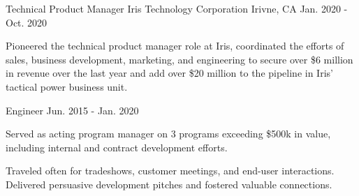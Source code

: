 \begin{cventries}
  \cventry
    {Technical Product Manager} %
    {Iris Technology Corporation} %
    {Irivne, CA} %
    {Jan. 2020 - Oct. 2020} %
    {
      \begin{cvitems} %
        \item {Pioneered the technical product manager role at Iris, coordinated the efforts of sales, business development, marketing, and engineering to secure over \$6 million in revenue over the last year and add over \$20 million to the pipeline in Iris' tactical power business unit.}
     \end{cvitems}
    }

    \cventry
    {Engineer} %
    {} %
    {}
    {Jun. 2015 - Jan. 2020} %
    {
      \begin{cvitems} %
      \item {Served as acting program manager on 3 programs exceeding \$500k in value, including internal and contract development efforts.}
        \item {Traveled often for tradeshows, customer meetings, and end-user interactions. Delivered persuasive development pitches and fostered valuable connections.}
      \end{cvitems}
    }

\end{cventries}
